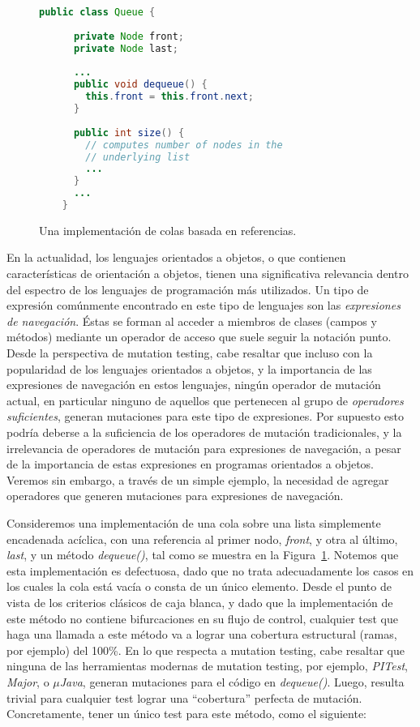 \begin{figure}[t]
	\begin{lstlisting}[frame=tlrb, mathescape=true, language=Java]
    public class Queue {
	
      private Node front;
      private Node last;
	
      ...
      public void dequeue() {
        this.front = this.front.next;
      }
	
      public int size() {
        // computes number of nodes in the 
        // underlying list
        ...
      }
      ...
    }
	\end{lstlisting}
	\caption{Una implementaci\'on de colas basada en referencias.}
	\label{figures.motivation.queue-class}
\end{figure}

En la actualidad, los lenguajes orientados a objetos, o que contienen caracter\'isticas de orientaci\'on a objetos, tienen una significativa relevancia dentro del espectro de los lenguajes de programaci\'on m\'as utilizados. Un tipo de expresi\'on com\'unmente encontrado en este tipo de lenguajes son las \emph{expresiones de navegaci\'on}. \'Estas se forman al acceder a miembros de clases (campos y m\'etodos) mediante un operador de acceso que suele seguir la notaci\'on punto. Desde la perspectiva de mutation testing, cabe resaltar que incluso con la popularidad de los lenguajes orientados a objetos, y la importancia de las expresiones de navegaci\'on en estos lenguajes, ning\'un operador de mutaci\'on actual, en particular ninguno de aquellos que pertenecen al grupo de \emph{operadores suficientes}, generan mutaciones para este tipo de expresiones. Por supuesto esto podr\'ia deberse a la suficiencia de los operadores de mutaci\'on tradicionales, y la irrelevancia de operadores de mutaci\'on para expresiones de navegaci\'on, a pesar de la importancia de estas expresiones en programas orientados a objetos. Veremos sin embargo, a trav\'es de un simple ejemplo, la necesidad de agregar operadores que generen mutaciones para expresiones de navegaci\'on.

Consideremos una implementaci\'on de una cola sobre una lista simplemente encadenada ac\'iclica, con una referencia al primer nodo, \emph{front}, y otra al \'ultimo, \emph{last}, y un m\'etodo \emph{dequeue()}, tal como se muestra en la Figura~\ref{figures.motivation.queue-class}. Notemos que esta implementaci\'on es defectuosa, dado que no trata adecuadamente los casos en los cuales la cola est\'a vac\'ia o consta de un \'unico elemento. Desde el punto de vista de los criterios cl\'asicos de caja blanca, y dado que la implementaci\'on de este m\'etodo no contiene bifurcaciones en su flujo de control, cualquier test que haga una llamada a este m\'etodo va a lograr una cobertura estructural (ramas, por ejemplo) del 100\%. En lo que respecta a mutation testing, cabe resaltar que ninguna de las herramientas modernas de mutation testing, por ejemplo, \emph{PITest}, \emph{Major}, o \emph{$\mu$Java}, generan mutaciones para el c\'odigo en \emph{dequeue()}. Luego, resulta trivial para cualquier test lograr una ``cobertura'' perfecta de mutaci\'on. Concretamente, tener un \'unico test para este m\'etodo, como el siguiente:

